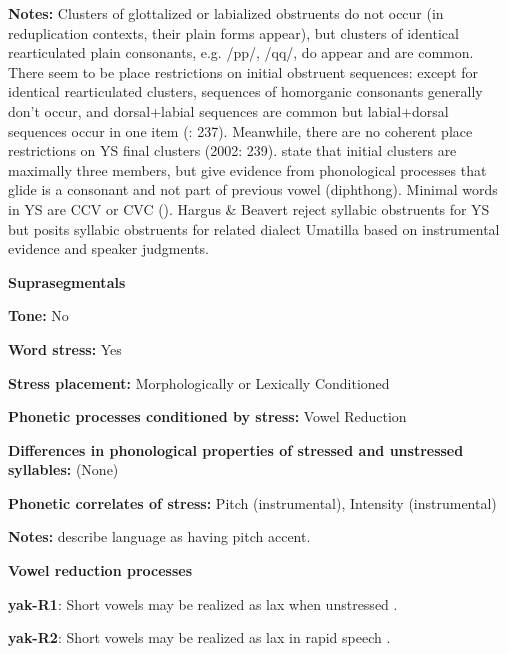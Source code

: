 \textbf{Notes:} Clusters of glottalized or labialized obstruents do not occur (in reduplication contexts, their plain forms appear), but clusters of identical rearticulated plain consonants, e.g. /pp/, /qq/, do appear and are common. There seem to be place restrictions on initial obstruent sequences: except for identical rearticulated clusters, sequences of homorganic consonants generally don’t occur, and dorsal+labial sequences are common but labial+dorsal sequences occur in one item (\citealt{HargusBeavert2002}: 237). Meanwhile, there are no coherent place restrictions on YS final clusters (2002: 239). \citet{RigsbyRude1996} state that initial clusters are maximally three members, but \citet{HargusBeavert2006} give evidence from phonological processes that glide is a consonant and not part of previous vowel (diphthong). Minimal words in YS are CCV or CVC (\citealt{HargusBeavert2006}). Hargus \& Beavert reject syllabic obstruents for YS but \citet{Minthorn2005} posits syllabic obstruents for related dialect Umatilla based on instrumental evidence and speaker judgments.



\textbf{Suprasegmentals}



\textbf{Tone:} No



\textbf{Word stress:} Yes



\textbf{Stress placement:} Morphologically or Lexically Conditioned



\textbf{Phonetic processes conditioned by stress:} Vowel Reduction



\textbf{Differences in phonological properties of stressed and unstressed syllables:} (None)



\textbf{Phonetic correlates of stress:} Pitch (instrumental), Intensity (instrumental)



\textbf{Notes:} \citet{HargusBeavert2005} describe language as having pitch accent.



\textbf{Vowel reduction processes}



\textbf{yak-R1}: Short vowels may be realized as lax when unstressed \citep[40]{Jansen2010}.



\textbf{yak-R2}: Short vowels may be realized as lax in rapid speech \citep[40]{Jansen2010}.



